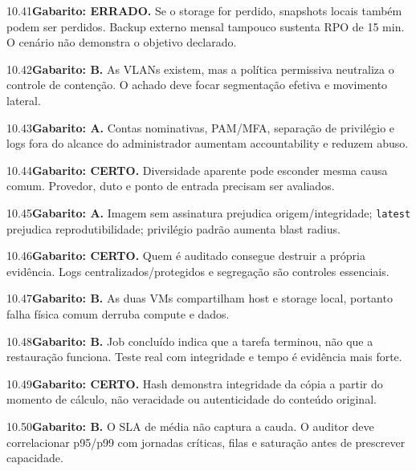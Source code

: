\begin{solucao}{10.41}\textbf{Gabarito: ERRADO.} Se o storage for perdido, snapshots locais também podem ser perdidos. Backup externo mensal tampouco sustenta RPO de 15 min. O cenário não demonstra o objetivo declarado.\end{solucao}
\begin{solucao}{10.42}\textbf{Gabarito: B.} As VLANs existem, mas a política permissiva neutraliza o controle de contenção. O achado deve focar segmentação efetiva e movimento lateral.\end{solucao}
\begin{solucao}{10.43}\textbf{Gabarito: A.} Contas nominativas, PAM/MFA, separação de privilégio e logs fora do alcance do administrador aumentam accountability e reduzem abuso.\end{solucao}
\begin{solucao}{10.44}\textbf{Gabarito: CERTO.} Diversidade aparente pode esconder mesma causa comum. Provedor, duto e ponto de entrada precisam ser avaliados.\end{solucao}
\begin{solucao}{10.45}\textbf{Gabarito: A.} Imagem sem assinatura prejudica origem/integridade; \texttt{latest} prejudica reprodutibilidade; privilégio padrão aumenta blast radius.\end{solucao}
\begin{solucao}{10.46}\textbf{Gabarito: CERTO.} Quem é auditado consegue destruir a própria evidência. Logs centralizados/protegidos e segregação são controles essenciais.\end{solucao}
\begin{solucao}{10.47}\textbf{Gabarito: B.} As duas VMs compartilham host e storage local, portanto falha física comum derruba compute e dados.\end{solucao}
\begin{solucao}{10.48}\textbf{Gabarito: B.} Job concluído indica que a tarefa terminou, não que a restauração funciona. Teste real com integridade e tempo é evidência mais forte.\end{solucao}
\begin{solucao}{10.49}\textbf{Gabarito: CERTO.} Hash demonstra integridade da cópia a partir do momento de cálculo, não veracidade ou autenticidade do conteúdo original.\end{solucao}
\begin{solucao}{10.50}\textbf{Gabarito: B.} O SLA de média não captura a cauda. O auditor deve correlacionar p95/p99 com jornadas críticas, filas e saturação antes de prescrever capacidade.\end{solucao}
